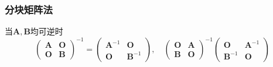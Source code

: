 \subsubsection{分块矩阵法}
当$\boldsymbol{A}, \boldsymbol{B}$均可逆时
$$
    \begin{pmatrix}
        \boldsymbol{A} & \boldsymbol{O} \\
        \boldsymbol{O} & \boldsymbol{B}
    \end{pmatrix}^{-1}
    =\begin{pmatrix}
        \boldsymbol{A}^{-1} & \boldsymbol{O}      \\
        \boldsymbol{O}      & \boldsymbol{B}^{-1}
    \end{pmatrix}
    ,\quad
    \begin{pmatrix}
        \boldsymbol{O} & \boldsymbol{A} \\
        \boldsymbol{B} & \boldsymbol{O}
    \end{pmatrix}^{-1}
    \begin{pmatrix}
        \boldsymbol{O}      & \boldsymbol{A}^{-1} \\
        \boldsymbol{B}^{-1} & \boldsymbol{O}
    \end{pmatrix}
$$


